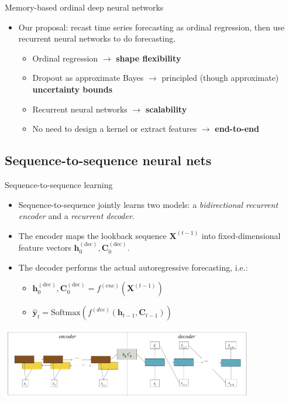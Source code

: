 \documentclass{beamer}
\theoremstyle{definition}
\theoremstyle{remark}
\begin{document}
\begin{frame}{Memory-based ordinal deep neural networks}
  \begin{itemize}
    \item \alert<+> {Our proposal: recast time series forecasting as ordinal regression, then use recurrent neural networks to do forecasting.}\pause
    {
        \begin{itemize}
            \item \alert<+> {Ordinal regression $\rightarrow$ \textbf{shape flexibility}}
            \item \alert<+> {Dropout as approximate Bayes \citep{pmlr-v48-gal16} $\rightarrow$ principled (though approximate) \textbf{uncertainty bounds}}
            \item \alert<+> {Recurrent neural networks $\rightarrow$ \textbf{scalability}}
            \item \alert<+> {No need to design a kernel or extract features $\rightarrow$ \textbf{end-to-end}}
        \end{itemize} \pause
    }
  \end{itemize}
\end{frame}

\subsection{Sequence-to-sequence neural nets}
\begin{frame}{Sequence-to-sequence learning}
    \begin{itemize}
        \item \alert<+>{Sequence-to-sequence \cite{Sutskever2014} jointly learns two models: a \textit{bidirectional recurrent encoder} and a \textit{recurrent decoder}.}\pause
        \item \alert<+>{The encoder maps the lookback sequence $\mathbf{X}^{(t-1)}$ into fixed-dimensional feature vectors $\mathbf{h}_0^{(\text{dec})}, \mathbf{C}_0^{(\text{dec})}$.} \pause 
        \item \alert<+>{The decoder performs the actual autoregressive forecasting, i.e.}:
        \begin{itemize}
            \item \alert<+>{$\mathbf{h}_0^{(\text{dec})}, \mathbf{C}_0^{(\text{dec})} = f^{(enc)}(\mathbf{X}^{(t-1)})$}
            \item \alert<+>{$\hat{\mathbf{y}}_t = \text{Softmax}\left(f^{(dec)}(\mathbf{h}_{t-1}, \mathbf{C}_{t-1})\right)$}
        \end{itemize}
    \end{itemize}
    \includegraphics[width=11cm]{plots/Seq2Seq.pdf}
\end{frame}
\end{document}
